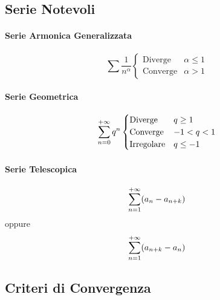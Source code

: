 \documentclass[12pt, a4paper]{article}
\begin{document}
\subsection*{Serie Notevoli}
\paragraph*{Serie Armonica Generalizzata}
\begin{equation*}
	\sum \frac{1}{n^\alpha} \begin{cases}
		\text{Diverge}  & \alpha\leq 1 \\
		\text{Converge} & \alpha> 1
	\end{cases}
\end{equation*}
\paragraph*{Serie Geometrica}
\begin{equation*}
	\sum_{n=0}^{+\infty} q^n \begin{cases}
		\text{Diverge}    & q\geq 1 \\
		\text{Converge}   & -1<q<1  \\
		\text{Irregolare} & q\leq -1
	\end{cases}
\end{equation*}
\paragraph*{Serie Telescopica}
\begin{equation*}
	\sum_{n=1}^{+\infty} (a_n - a_{n+k})
\end{equation*}
oppure
\begin{equation*}
	\sum_{n=1}^{+\infty} (a_{n+k} - a_n)
\end{equation*}
\subsection*{Criteri di Convergenza} 
\end{document}
